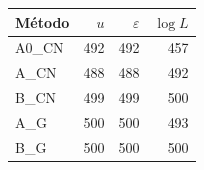 \begin{tabular}{lrrr}
\hline
Método & $u$ & $\varepsilon$ & $\log L$ \\
\hline
A0\_CN & 492 & 492 & 457 \\
A\_CN & 488 & 488 & 492 \\
B\_CN & 499 & 499 & 500 \\
A\_G & 500 & 500 & 493 \\
B\_G & 500 & 500 & 500 \\
\hline
\end{tabular}
